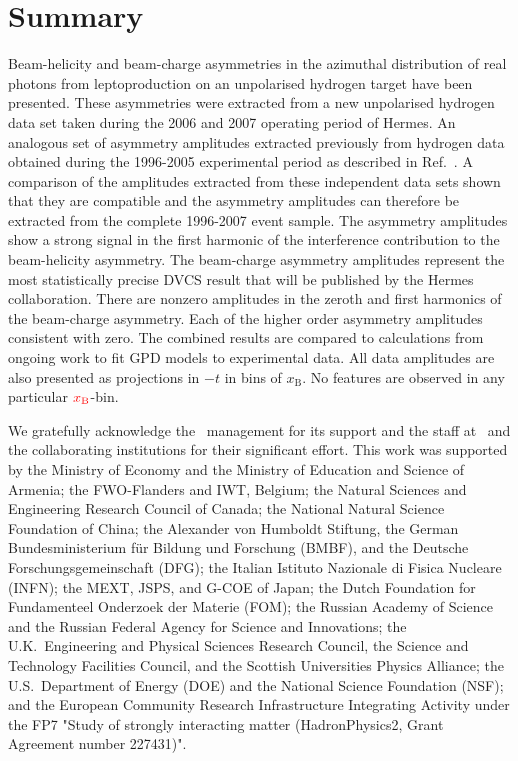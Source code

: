 \section{Summary}

Beam-helicity and beam-charge asymmetries in the azimuthal distribution of real photons from leptoproduction on an unpolarised hydrogen target have been presented. These asymmetries were extracted from a new unpolarised hydrogen data set taken during the 2006 and 2007 operating period of H{\sc ermes}. An analogous set of asymmetry amplitudes  extracted previously from hydrogen data obtained during the 1996-2005 experimental period as described in Ref.~\cite{Air09}. A comparison of the amplitudes extracted from these independent data sets  shown that they are compatible and the asymmetry amplitudes can therefore be extracted from the complete 1996-2007 event sample. The  asymmetry amplitudes show a strong signal in the first harmonic of the interference contribution to the beam-helicity asymmetry. The beam-charge asymmetry amplitudes represent the most statistically precise DVCS result that will be published by the H{\sc ermes} collaboration. There are non\red{-}zero amplitudes in the zeroth and first harmonics of the beam-charge asymmetry. Each of the higher order asymmetry amplitudes  consistent with zero. The combined results are compared to calculations from ongoing work to fit GPD models to experimental data. All data amplitudes are also presented as projections in $-t$ in bins of $x_{\textrm{B}}$. No  features are observed in any particular ${\color{red}{x_{\textrm{B}}}\color{black}}$-bin.

\acknowledgments
We gratefully acknowledge the \desy\ management for its support and the staff
at \desy\ and the collaborating institutions for their significant effort.
This work was supported by 
the Ministry of Economy and the Ministry of Education and Science of Armenia;
the FWO-Flanders and IWT, Belgium;
the Natural Sciences and Engineering Research Council of Canada;
the National Natural Science Foundation of China;
the Alexander von Humboldt Stiftung,
the German Bundesministerium f\"ur Bildung und Forschung (BMBF), and
the Deutsche Forschungsgemeinschaft (DFG);
the Italian Istituto Nazionale di Fisica Nucleare (INFN);
the MEXT, JSPS, and G-COE of Japan;
the Dutch Foundation for Fundamenteel Onderzoek der Materie (FOM);
the Russian Academy of Science and the Russian Federal Agency for 
Science and Innovations;
the U.K.~Engineering and Physical Sciences Research Council, 
the Science and Technology Facilities Council,
and the Scottish Universities Physics Alliance;
the U.S.~Department of Energy (DOE) and the National Science Foundation (NSF);
and the European Community Research Infrastructure Integrating Activity
under the FP7 "Study of strongly interacting matter (HadronPhysics2, Grant
Agreement number 227431)".

